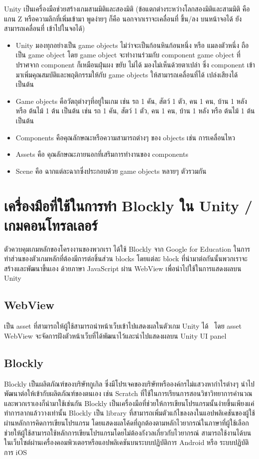 Unity เป็นเครื่องมือช่วยสร้างเกมสามมิติและสองมิติ 
(ข้อแตกต่างระหว่างโลกสองมิติและสามมิติ คือแกน Z หรือความลึกที่เพิ่มเข้ามา 
พูดง่ายๆ ก็คือ นอกจากเราจะเคลื่อนที่ ขึ้น/ลง บนหน้าจอได้ ยังสามารถเคลื่อนที่ 
เข้าไปในจอได้)~\cite{unth}
\begin{itemize}
  \item Unity มองทุกอย่างเป็น game objects ไม่ว่าจะเป็นก้อนหินก้อนหนึ่ง 
  หรือ แมลงตัวหนึ่ง ถือเป็น game object โดย game object 
  จะทำงานร่วมกับ component game object ที่ปราศจาก component 
  ก็เหมือนฝุ่นผง ขยับ ไม่ได้ มองไม่เห็นด้วยตาเปล่า ซึ่ง component 
  เข้ามาเพิ่มคุณสมบัติและพฤติกรรมให้กับ game objects ให้สามารถเคลื่อนที่ได้ 
  เปล่งเสียงได้ เป็นต้น
  \item Game objects คือวัตถุต่างๆที่อยู่ในเกม 
  เช่น รถ 1 คัน, สัตว์ 1 ตัว, คน 1 คน, บ้าน 1 หลัง หรือ ต้นไม้ 1 ต้น เป็นต้น
  เช่น รถ 1 คัน, สัตว์ 1 ตัว, คน 1 คน, บ้าน 1 หลัง หรือ ต้นไม้ 1 ต้น เป็นต้น
  \item Components คือคุณลักษณะหรือความสามารถต่างๆ ของ objects เช่น การเคลื่อนไหว
  \item Assets คือ คุณลักษณะภายนอกที่เสริมการทำงานของ components
  \item Scene คือ ฉากแต่ละฉากซึ่งประกอบด้วย game objects หลายๆ ตัวรวมกัน
\end{itemize}

\section{เครื่องมือที่ใช้ในการทำ Blockly ใน Unity / เกมคอนโทรลเลอร์}
ตัวควบคุมเกมหลักของโครงงานของพวกเรา ได้ใช้ Blockly 
จาก Google for Education ในการทำส่วนของตัวเกมหลักที่ต้องมีการต่อชิ้นส่วน 
blocks โดยแต่ละ block ที่นำมาต่อกันนั้นพวกเราจะสร้างและพัฒนาขึ้นเอง ด้วยภาษา 
JavaScript ผ่าน WebView เพื่อนำไปใช้ในการแสดงผลบน Unity

\subsection{WebView}
เป็น asset ที่สามารถให้ผู้ใช้สามารถนำหน้าเว็บเข้าไปแสดงผลในตัวเกม Unity ได้~\cite{unw} โดย asset WebView จะจัดการฝังตัวหน้าเว็บที่ได้พัฒนาไว้และนำไปแสดงผลบน Unity UI panel

\subsection{Blockly}
Blockly เป็นผลิตภัณฑ์ของบริษัทกูเกิล ซึ่งมีโปรเจคของบริษัทหรือองค์กรไม่แสวงหากำไรต่างๆ นำไปพัฒนาต่อให้เข้ากับผลิตภัณฑ์ของตนเอง เช่น Scratch ที่ใช้ในการเรียนการสอนวิชาวิทยาการคำนวณ
และพวกเราเองก็นำมาใช้เช่นกัน Blockly 
เป็นเครื่องมือที่ช่วยให้การเขียนโปรแกรมนั้นง่ายขึ้นเพียงแค่ทำการลากแล้ววางเท่านั้น
Blockly เป็น library ที่สามารถเพิ่มตัวแก้ไขลงลงในแอปพลิเคชันของผู้ใช้ผ่านหลักการคิดการเขียนโปรแกรม
โดยแสดงผลโค้ดที่ถูกต้องตามหลักไวยากรณ์ในภาษาที่ผู้ใช้เลือก 
ช่วยให้ผู้ใช้สามารถใช้หลักการเขียนโปรแกรมโดยไม่ต้องกังวลเกี่ยวกับไวยากรณ์ 
สามารถใช้งานได้บนในเว็บไซต์ผ่านเครื่องคอมพิวเตอรหรือแอปพลิเคชันบนระบบปฏิบัติการ Android หรือ ระบบปฏิบัติการ iOS~\cite{blc}


